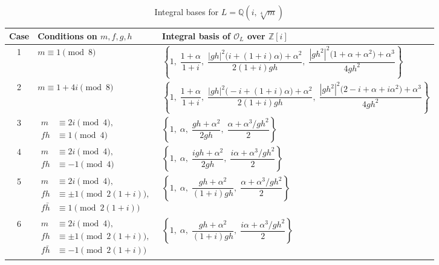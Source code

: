\documentclass{amsart}
\newcommand{\Q}{\mathbb{Q}}
\newcommand{\Z}{\mathbb{Z}}
\theoremstyle{plain}
\theoremstyle{definition}
\theoremstyle{remark}
\numberwithin{equation}{section}
\begin{document}
\begin{table}[ht]
\centering
\scriptsize
\renewcommand{\arraystretch}{1.15}
\caption{Integral bases for $L=\Q(i,\sqrt[4]{m})$}
\label{tab:integral-bases}
\begin{adjustbox}{max width=\textwidth}
\begin{tabular}{|c|p{6cm}|p{9cm}|}
\hline
\textbf{Case} & \textbf{Conditions on $m,f,g,h$} & \textbf{Integral basis of $\mathcal O_L$ over $\Z[i]$} \\
\hline
1
&
$m \equiv 1 \pmod{8}$
&
$\left\{
1,\;
\dfrac{1+\alpha}{1+i},\;
\dfrac{|gh|^{2}\bigl(i+(1+i)\alpha\bigr)+\alpha^{2}}{2(1+i)gh},\;
\dfrac{|gh^{2}|^{2}\bigl(1+\alpha+\alpha^{2}\bigr)+\alpha^{3}}{4gh^{2}}
\right\}$ \\
\hline
2
&
$m \equiv 1+4i \pmod{8}$
&
$\left\{
1,\;
\dfrac{1+\alpha}{1+i},\;
\dfrac{|gh|^{2}\bigl(-i+(1+i)\alpha\bigr)+\alpha^{2}}{2(1+i)gh},\;
\dfrac{|gh^{2}|^{2}\bigl(2-i+\alpha+i\alpha^{2}\bigr)+\alpha^{3}}{4gh^{2}}
\right\}$ \\
\hline
3
&
$\begin{aligned}
m &\equiv 2i \pmod{4},\\
fh &\equiv 1 \pmod{4}
\end{aligned}$
&
$\left\{
1,\;
\alpha,\;
\dfrac{gh+\alpha^{2}}{2gh},\;
\dfrac{\alpha+\alpha^{3}/gh^{2}}{2}
\right\}$ \\
\hline
4
&
$\begin{aligned}
m &\equiv 2i \pmod{4},\\
fh &\equiv -1 \pmod{4}
\end{aligned}$
&
$\left\{
1,\;
\alpha,\;
\dfrac{i gh+\alpha^{2}}{2gh},\;
\dfrac{i\alpha+\alpha^{3}/gh^{2}}{2}
\right\}$ \\
\hline
5
&
$\begin{aligned}
m &\equiv 2i \pmod{4},\\
fh &\equiv \pm1 \pmod{2(1+i)},\\
f\bar h &\equiv 1 \pmod{2(1+i)}
\end{aligned}$
&
$\left\{
1,\;
\alpha,\;
\dfrac{gh+\alpha^{2}}{(1+i)gh},\;
\dfrac{\alpha+\alpha^{3}/gh^{2}}{2}
\right\}$ \\
\hline
6
&
$\begin{aligned}
m &\equiv 2i \pmod{4},\\
fh &\equiv \pm1 \pmod{2(1+i)},\\
f\bar h &\equiv -1 \pmod{2(1+i)}
\end{aligned}$
&
$\left\{
1,\;
\alpha,\;
\dfrac{gh+\alpha^{2}}{(1+i)gh},\;
\dfrac{i\alpha+\alpha^{3}/gh^{2}}{2}
\right\}$ \\

\end{tabular}
\end{adjustbox}
\end{table}
\end{document}

